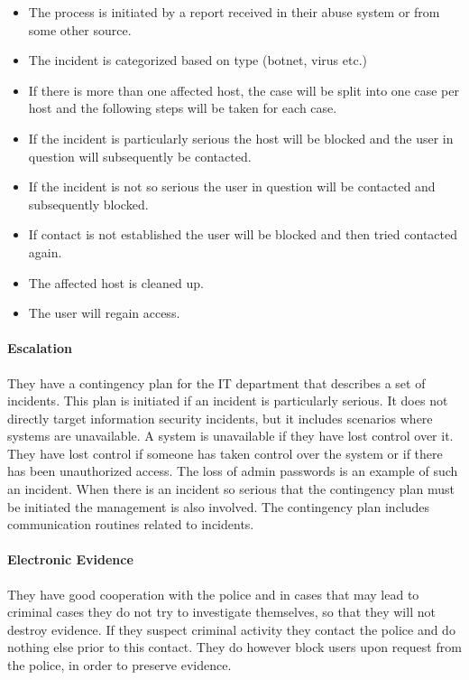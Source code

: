 \begin{itemize}\itemsep-0.2cm
\item The process is initiated by a report received in their abuse system or from some other source. 
\item The incident is categorized based on type (botnet, virus etc.)
\item If there is more than one affected host, the case will be split into one case per host and the following steps will be taken for each case.
\item If the incident is particularly serious the host will be blocked and the user in question will subsequently be contacted.
\item If the incident is not so serious the user in question will be contacted and subsequently blocked.
\item If contact is not established the user will be blocked and then tried contacted again.
\item The affected host is cleaned up.
\item The user will regain access.
\end{itemize}

\paragraph{Escalation}
They have a contingency plan for the IT department that describes a set of incidents. This plan is initiated if an incident is particularly serious. It does not directly target information security incidents, but it includes scenarios where systems are unavailable. A system is unavailable if they have lost control over it. They have lost control if someone has taken control over the system or if there has been unauthorized access. The loss of admin passwords is an example of such an incident. When there is an incident so serious that the contingency plan must be initiated the management is also involved. The contingency plan includes communication routines related to incidents. 

\paragraph{Electronic Evidence}
They have good cooperation with the police and in cases that may lead to criminal cases they do not try to investigate themselves, so that they will not destroy evidence. If they suspect criminal activity they contact the police and do nothing else prior to this contact. They do however block users upon request from the police, in order to preserve evidence.

